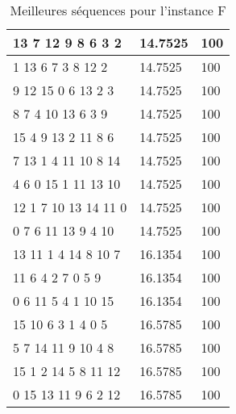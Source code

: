 \begin{table}[H]
\begin{tabular}{|l|l|l|}
		13 7 12 9 8 6 3 2    & 14.7525 & 100     \\ \hline
		1 13 6 7 3 8 12 2    & 14.7525 & 100     \\ \hline
		9 12 15 0 6 13 2 3   & 14.7525 & 100     \\ \hline
		8 7 4 10 13 6 3 9    & 14.7525 & 100     \\ \hline
		15 4 9 13 2 11 8 6   & 14.7525 & 100     \\ \hline
		7 13 1 4 11 10 8 14  & 14.7525 & 100     \\ \hline
		4 6 0 15 1 11 13 10  & 14.7525 & 100     \\ \hline
		12 1 7 10 13 14 11 0 & 14.7525 & 100     \\ \hline
		0 7 6 11 13 9 4 10   & 14.7525 & 100     \\ \hline
		13 11 1 4 14 8 10 7  & 16.1354 & 100     \\ \hline
		11 6 4 2 7 0 5 9     & 16.1354 & 100     \\ \hline
		0 6 11 5 4 1 10 15   & 16.1354 & 100     \\ \hline
		15 10 6 3 1 4 0 5    & 16.5785 & 100     \\ \hline
		5 7 14 11 9 10 4 8   & 16.5785 & 100     \\ \hline
		15 1 2 14 5 8 11 12  & 16.5785 & 100     \\ \hline
		0 15 13 11 9 6 2 12  & 16.5785 & 100     \\ \hline
		\end{tabular}
		\caption{Meilleures séquences pour l'instance F}
		\label{tab:best-seq-instanceF}
	\end{table}
